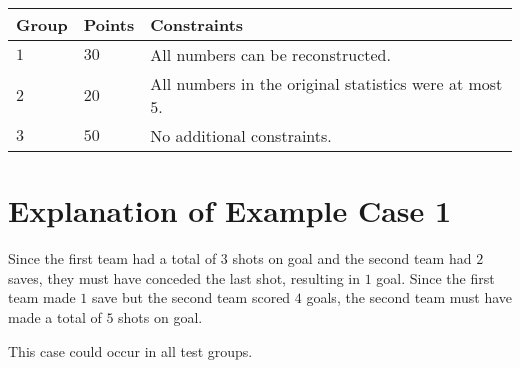 \noindent
\begin{tabular}{| l | l | p{12cm} |}
  \hline
  \textbf{Group} & \textbf{Points} & \textbf{Constraints} \\ \hline
  $1$   & $30$         & All numbers can be reconstructed. \\ \hline
  $2$   & $20$         & All numbers in the original statistics were at most $5$. \\ \hline
  $3$   & $50$         & No additional constraints. \\ \hline
\end{tabular}

\section*{Explanation of Example Case 1}
Since the first team had a total of $3$ shots on goal and the second team had $2$ saves, they must have conceded the last shot, resulting in $1$ goal.
Since the first team made $1$ save but the second team scored $4$ goals, the second team must have made a total of $5$ shots on goal.

This case could occur in all test groups.
